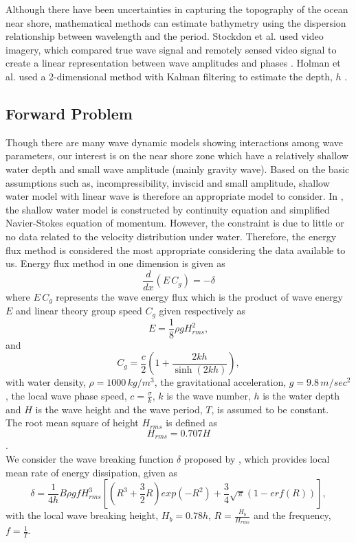 Although there have been uncertainties in capturing the topography of the ocean near shore, mathematical methods can estimate bathymetry using the dispersion relationship between wavelength and the period. Stockdon et al. used video imagery, which compared true wave signal and remotely sensed video signal to create a linear representation between wave amplitudes and phases \citep{stockdon2000}.  Holman et al. used a 2-dimensional method with Kalman filtering to estimate the depth, $h$ \citep{holman2013}.
\subsection{Forward Problem}\label{forwardproblem}
Though there are many wave dynamic models showing interactions among wave parameters, our interest is on the near shore zone which have a relatively shallow water depth and small wave amplitude (mainly gravity wave). Based on the basic assumptions such as, incompressibility, inviscid and small amplitude, shallow water model with linear wave is therefore an appropriate model to consider. In \cite{dean1991water}, the shallow water model is constructed by continuity equation and simplified Navier-Stokes equation of momentum. However, the constraint is due to little or no data related to the velocity distribution under water. Therefore, the energy flux method is considered the most appropriate considering the data available to us. Energy flux method in one dimension is given as \cite{Alex2007}
\begin{equation}\label{eqn:forward}
\frac{d}{dx}\left(E\,C_{g}\right)=-\delta
\end{equation}
where ${E\,C_{g}}$ represents the wave energy flux which is the product of wave energy $E$ and linear theory group speed $C_g$ given respectively as 
\begin{equation}\label{eqn:energy}
E=\frac{1}{8}\rho g H_{rms}^2,
\end{equation}
and 
\begin{equation}
\label{cg}
C_g=\frac{c}{2}\left(1+\frac{2kh}{\sinh(2kh)}\right),
\end{equation}
with water density, ${\rho=1000\,kg/m^3}$, the gravitational acceleration, ${g=9.8 \,m/sec^2}$, the local wave
phase speed, $c=\frac{\sigma}{k}$, $k$ is the wave number, $h$ is the water depth and $H$ is the wave height and the wave period, $T$, is assumed to be constant.\\
The root mean square of height ${H_{rms}}$ is defined as\\
$${H_{rms}=0.707 H}$$.\\
We consider the wave breaking function $\delta$ proposed by \cite{Alex2007}, which provides local mean rate of energy dissipation, given as
\begin{equation}\label{eqn:dissipation}
\delta = \frac{1}{4h}B\rho g f H_{rms}^3\left[(R^3+\frac{3}{2}R)exp(-R^2)+\frac{3}{4}\sqrt{\pi}(1-erf(R))\right],
\end{equation}
with the local wave breaking height, $H_b=0.78h$, $R=\frac{H_b}{H_{rms}}$ and the frequency, $f=\frac{1}{T}$.

